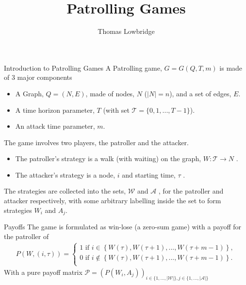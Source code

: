 \documentclass[11pt]{beamer}
\author{Thomas Lowbridge}
\title{Patrolling Games}
\institute{University Of Nottingham}
\begin{document}
\begin{frame}
\titlepage
\end{frame}


\begin{frame}{Introduction to Patrolling Games}
A Patrolling game, $G=G(Q,T,m)$ is made of 3 major components
\begin{itemize}
\item A Graph, $Q=(N,E)$, made of nodes, $N$ ($|N|=n$), and a set of edges, $E$.
\item A time horizon parameter, $T$ (with set $\mathcal{T}=\{0,1,...,T-1\}$).
\item An attack time parameter, $m$.
\end{itemize}

The game involves two players, the patroller and the attacker.
\begin{itemize}
\item The patroller's strategy is a walk (with waiting) on the graph, $W:\mathcal{T} \rightarrow  N$ .
\item The attacker's strategy is a node, $i$ and starting time, $\tau$ .
\end{itemize} 
The strategies are collected into the sets, $\mathcal{W}$ and $\mathcal{A}$ , for the patroller and attacker respectively, with some arbitrary labelling inside the set to form strategies $W_{i}$ and $A_{j}$.

\end{frame}

\begin{frame}{Payoffs}
The game is formulated as win-lose (a zero-sum game) with a payoff for the patroller of
\begin{align*}
P(W,(i,\tau))=\left\{ \begin{array}{l}
1 \text{  if  } i \in \left\{ W(\tau),W(\tau+1),...,W(\tau+m-1) \right\} ,\\
0 \text{  if  } i \notin \left\{ W(\tau),W(\tau+1),...,W(\tau+m-1) \right\} .\\
\end{array}\right.
\end{align*}
With a pure payoff matrix $\mathcal{P}=(P(W_{i},A_{j}))_{i \in \{ 1,...,|\mathcal{W}| \}, j \in \{ 1,...,|\mathcal{A}| \}}$
\end{frame}
\end{document}
